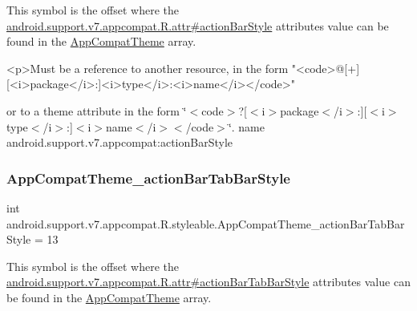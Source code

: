 This symbol is the offset where the \hyperlink{classandroid_1_1support_1_1v7_1_1appcompat_1_1R_1_1attr_a20d4f2ebf315d126dc70833d98921b1d}{android.\+support.\+v7.\+appcompat.\+R.\+attr\#action\+Bar\+Style} attribute\textquotesingle{}s value can be found in the \hyperlink{classandroid_1_1support_1_1v7_1_1appcompat_1_1R_1_1styleable_a5c42f89e8a410c323be34208d75c430b}{App\+Compat\+Theme} array.

\begin{DoxyVerb}      <p>Must be a reference to another resource, in the form "<code>@[+][<i>package</i>:]<i>type</i>:<i>name</i></code>"
\end{DoxyVerb}
 or to a theme attribute in the form \char`\"{}$<$code$>$?\mbox{[}$<$i$>$package$<$/i$>$\+:\mbox{]}\mbox{[}$<$i$>$type$<$/i$>$\+:\mbox{]}$<$i$>$name$<$/i$>$$<$/code$>$\char`\"{}.  name android.\+support.\+v7.\+appcompat\+:action\+Bar\+Style \mbox{\label{classandroid_1_1support_1_1v7_1_1appcompat_1_1R_1_1styleable_ac89b799df31756d7b6caae2096111d8c}} 
\subsubsection{\texorpdfstring{App\+Compat\+Theme\+\_\+action\+Bar\+Tab\+Bar\+Style}{AppCompatTheme\_actionBarTabBarStyle}}
{\footnotesize\ttfamily int android.\+support.\+v7.\+appcompat.\+R.\+styleable.\+App\+Compat\+Theme\+\_\+action\+Bar\+Tab\+Bar\+Style = 13\hspace{0.3cm}{\ttfamily [static]}}

This symbol is the offset where the \hyperlink{classandroid_1_1support_1_1v7_1_1appcompat_1_1R_1_1attr_a11ff2b39bc8cffba2532abb673a5413a}{android.\+support.\+v7.\+appcompat.\+R.\+attr\#action\+Bar\+Tab\+Bar\+Style} attribute\textquotesingle{}s value can be found in the \hyperlink{classandroid_1_1support_1_1v7_1_1appcompat_1_1R_1_1styleable_a5c42f89e8a410c323be34208d75c430b}{App\+Compat\+Theme} array.

